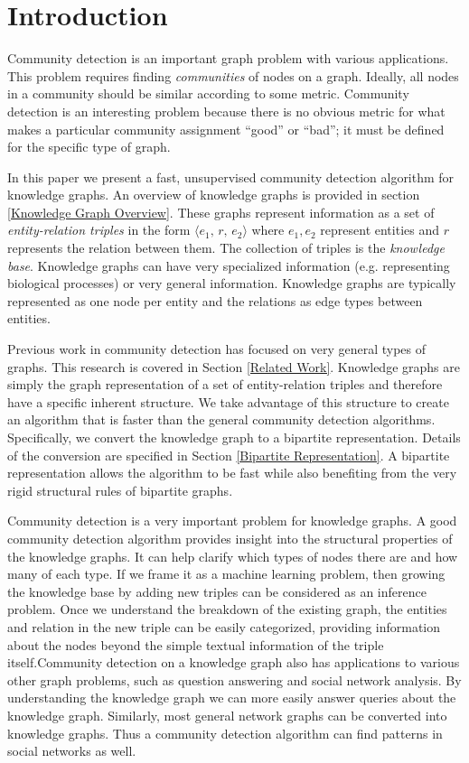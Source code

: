 \documentclass[12pt]{article}
\begin{document}
\section{Introduction}
\label{Introduction}

Community detection is an important graph problem with various applications.
This problem requires finding \textit{communities} of nodes on a graph. Ideally,
all nodes in a community should be similar according to some metric. Community
detection is an interesting problem because there is no obvious metric for
what makes a particular community assignment ``good'' or ``bad''; it must be
defined for the specific type of graph.

In this paper we present a fast, unsupervised community detection algorithm for
knowledge graphs. An overview of knowledge graphs is provided in section
\ref{Knowledge Graph Overview}. These graphs represent information as a set of
\textit{entity-relation triples} in the form $\langle e_1,\,r,\,e_2 \rangle$
where $e_1,e_2$ represent entities and $r$ represents the relation between them.
The collection of triples is the \textit{knowledge base}. Knowledge graphs can
have very specialized information (e.g. representing biological processes) or
very general information. Knowledge graphs are typically represented as one node
per entity and the relations as edge types between entities.

Previous work in community detection has focused on very general types of
graphs. This research is covered in Section \ref{Related Work}. Knowledge graphs
are simply the graph representation of a set of entity-relation triples and
therefore have a specific inherent structure. We take advantage of this
structure to create an algorithm that is faster than the general community
detection algorithms. Specifically, we convert the knowledge graph to a
bipartite representation. Details of the conversion are specified in Section
\ref{Bipartite Representation}. A bipartite representation allows the algorithm
to be fast while also benefiting from the very rigid structural rules of
bipartite graphs.

Community detection is a very important problem for knowledge graphs. A good
community detection algorithm provides insight into the structural properties of
the knowledge graphs. It can help clarify which types of nodes there are and how
many of each type. If we frame it as a machine learning problem, then growing
the knowledge base by adding new triples can be considered as an inference
problem. Once we understand the breakdown of the existing graph, the entities
and relation in the new triple can be easily categorized, providing information
about the nodes beyond the simple textual information of the triple
itself.Community detection on a knowledge graph also has applications to various
other graph problems, such as question answering and social network analysis. By
understanding the knowledge graph we can more easily answer queries about the
knowledge graph. Similarly, most general network graphs can be converted into
knowledge graphs. Thus a community detection algorithm can find patterns in
social networks as well.
\end{document}
